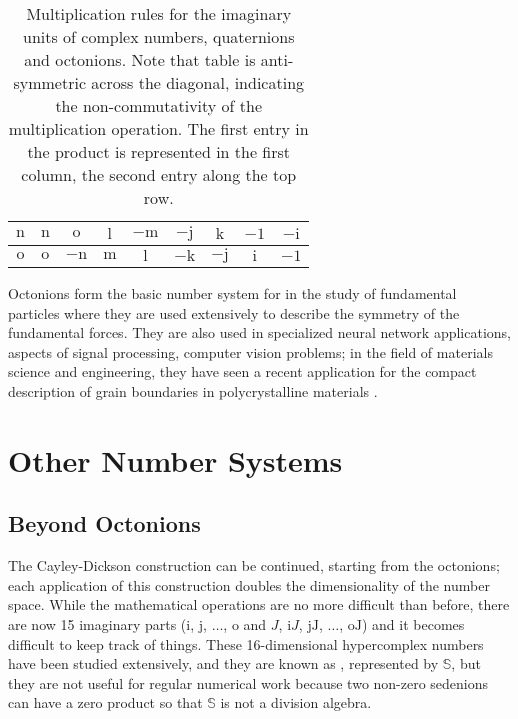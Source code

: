 \begin{table}
\begin{tabular}{|c|c|c|c|c|c|c|c|c|}
\hline
 $\mathrm{n}$ &{\color{OCHighlandsSkyBlue}$\mathrm{n}$} & {\color{OCHighlandsSkyBlue}$\mathrm{o}$}  & {\color{OCHighlandsSkyBlue}$\mathrm{l}$} & {\color{OCHighlandsSkyBlue}$-\mathrm{m}$} & 
 {\color{OCHighlandsSkyBlue}$-\mathrm{j}$} & {\color{OCHighlandsSkyBlue}$\mathrm{k}$} &  {\color{OCHighlandsSkyBlue}$-1$} &{\color{OCHighlandsSkyBlue}$-\mathrm{i}$} \\
\hline
 $\mathrm{o}$ &{\color{OCHighlandsSkyBlue}$\mathrm{o}$} & {\color{OCHighlandsSkyBlue}$-\mathrm{n}$}  & {\color{OCHighlandsSkyBlue}$\mathrm{m}$} & {\color{OCHighlandsSkyBlue}$\mathrm{l}$} & 
 {\color{OCHighlandsSkyBlue}$-\mathrm{k}$} & {\color{OCHighlandsSkyBlue}$-\mathrm{j}$} &  {\color{OCHighlandsSkyBlue}$\mathrm{i}$} &{\color{OCHighlandsSkyBlue}$-1$} \\
\hline
\end{tabular}
\caption{Multiplication rules for the imaginary units of {\color{OCGreenThread}complex numbers}, {\color{OCCarnegieRed}quaternions} and {\color{OCHighlandsSkyBlue}octonions}. Note that table is  anti-symmetric across the diagonal, indicating the non-commutativity of the multiplication operation. The first entry in the product is represented in the first column, the second entry along the top row.}
\end{table} 

Octonions form the basic number system for  in the study of fundamental particles where they are used extensively to describe the symmetry of the fundamental forces.  They are also used in specialized neural network applications, aspects of signal processing, computer vision problems; in the field of materials science and engineering, they have seen a recent application for the compact description of grain boundaries in polycrystalline materials \cite{degraef2019h}.



\section{Other Number Systems}

\subsection{Beyond Octonions}
The Cayley-Dickson construction can be continued, starting from the octonions; each application of this construction doubles the dimensionality of the number space. While the mathematical operations are no more difficult than before, there are now 15 imaginary parts ($\mathrm{i}$, $\mathrm{j}$, $\ldots$, $\mathrm{o}$ and  $J$, $\mathrm{i}J$, $\mathrm{jJ}$, $\ldots$, $\mathrm{oJ}$) and it becomes difficult to keep track of things. These 16-dimensional hypercomplex numbers have been studied extensively, and they are known as , represented by $\mathbb{S}$, but they are not useful for regular numerical work because  two non-zero sedenions can have a zero product so that $\mathbb{S}$ is not a division algebra.  

